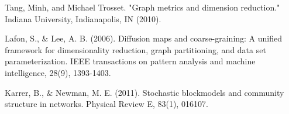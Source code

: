 \documentclass[12pt]{article}
\theoremstyle{definition}
\begin{document}
\begin{thebibliography}{1}
	 Tang, Minh, and Michael Trosset. "Graph metrics and dimension reduction." Indiana University, Indianapolis, IN (2010).
	
	 Lafon, S., $\&$ Lee, A. B. (2006). Diffusion maps and coarse-graining: A unified framework for dimensionality reduction, graph partitioning, and data set parameterization. IEEE transactions on pattern analysis and machine intelligence, 28(9), 1393-1403.
	
	 Karrer, B., $\&$ Newman, M. E. (2011). Stochastic blockmodels and community structure in networks. Physical Review E, 83(1), 016107.
	
	
	
\end{thebibliography}
\end{document}
